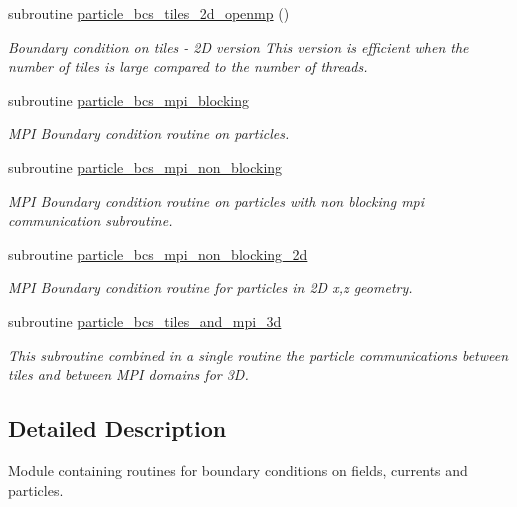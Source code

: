 \begin{DoxyCompactItemize}
subroutine \hyperlink{namespaceboundary_a9f9517df19ef503bb2a69e63aeec91d4}{particle\+\_\+bcs\+\_\+tiles\+\_\+2d\+\_\+openmp} ()
\begin{DoxyCompactList}\small\item\em Boundary condition on tiles -\/ 2D version This version is efficient when the number of tiles is large compared to the number of threads. \end{DoxyCompactList}\item 
subroutine \hyperlink{namespaceboundary_a1789d63402ac897697791a2fca4fa8e6}{particle\+\_\+bcs\+\_\+mpi\+\_\+blocking}
\begin{DoxyCompactList}\small\item\em M\+PI Boundary condition routine on particles. \end{DoxyCompactList}\item 
subroutine \hyperlink{namespaceboundary_aac32f7f65f1998963706f9d5776d29d2}{particle\+\_\+bcs\+\_\+mpi\+\_\+non\+\_\+blocking}
\begin{DoxyCompactList}\small\item\em M\+PI Boundary condition routine on particles with non blocking mpi communication subroutine. \end{DoxyCompactList}\item 
subroutine \hyperlink{namespaceboundary_a3293856926030dfea9e8ca05c61e1a5a}{particle\+\_\+bcs\+\_\+mpi\+\_\+non\+\_\+blocking\+\_\+2d}
\begin{DoxyCompactList}\small\item\em M\+PI Boundary condition routine for particles in 2D x,z geometry. \end{DoxyCompactList}\item 
subroutine \hyperlink{namespaceboundary_ac117306978e83b787afba90c3ac038f4}{particle\+\_\+bcs\+\_\+tiles\+\_\+and\+\_\+mpi\+\_\+3d}
\begin{DoxyCompactList}\small\item\em This subroutine combined in a single routine the particle communications between tiles and between M\+PI domains for 3D. \end{DoxyCompactList}\end{DoxyCompactItemize}


\subsection{Detailed Description}
Module containing routines for boundary conditions on fields, currents and particles. 

